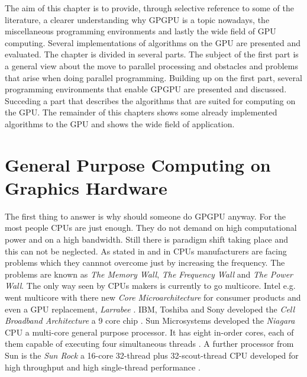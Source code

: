 The aim of this chapter is to provide, through selective reference to some
of the literature, a clearer understanding why \gls{GPGPU} is a topic nowadays,
the miscellaneous programming environments and lastly the wide field of \gls{GPU}
computing. Several implementations of algorithms on the \gls{GPU} are presented
and evaluated. 
The chapter is divided in several parts. The subject of the first part is a
general view about the move to parallel processing and obstacles and problems
that arise when doing parallel programming. Building up on the first part,
several programming environments that enable \gls{GPGPU} are presented and
discussed. Succeding a part that describes the algorithms that are suited for
computing on the \gls{GPU}. The remainder of this chapters shows some already
implemented algorithms to the \gls{GPU} and shows the wide field of application.




\section{General Purpose Computing on Graphics Hardware} %
\label{sec:gpgpu}

The first thing to answer is why should someone do \gls{GPGPU} anyway. For the
most people \glspl{CPU} are just enough. They do not demand on high
computational power and on a high bandwidth. Still there is paradigm shift
taking place and this can not be neglected. As stated in
\citep{citeulike:1187394} and in \citep{citeulike:3421647} \glspl{CPU}
manufacturers are facing problems which they cannnot overcome just by increasing
the frequency. The problems are known as \emph{The Memory
Wall}\citep{citeulike:457955}, \emph{The Frequency Wall} and \emph{The Power
Wall}. The only way seen by \glspl{CPU} makers is currently to go multicore.
Intel e.g. went multicore with there new \emph{Core Microarchitecture} for
consumer products and even a \gls{GPU} replacement, \emph{Larrabee}
\citep{citeulike:3153758}. \Gls{IBM}, Toshiba and Sony developed the \emph{Cell
Broadband Architecture} a 9 core chip \citep{citeulike:1243173}. Sun Microsystems
developed the \emph{Niagara} \gls{CPU} a multi-core general purpose processor. 
It has eight in-order cores, each of them capable of executing four simultaneous threads
\citep{citeulike:3743958}. A further processor from Sun is the \emph{Sun Rock} a
16-core 32-thread plus 32-scout-thread \gls{CPU} developed for high throughput
and high single-thread performance \citep{citeulike:6643579}.

